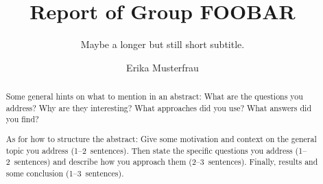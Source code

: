 \title{Report of Group FOOBAR}
\subtitle{Maybe a longer but still short subtitle.}         %


\author{Erika Musterfrau}

\begin{abstract}
 Some general hints on what to mention in an abstract: What are the questions you address? Why are they interesting? What approaches did you use? What answers did you find?
 
 As for how to structure the abstract: Give some motivation and context on the general topic you address (1--2~sentences). Then state the specific questions you address (1--2~sentences) and describe how you approach them (2--3~sentences). Finally, results and some conclusion (1--3~sentences).
\end{abstract}

\maketitle
